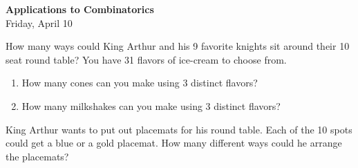 \documentclass[12pt]{article}
\theoremstyle{plain}
\theoremstyle{definition}
\theoremstyle{remark}
\begin{document}
\Large
\begin{center}
 \textbf{\LARGE Applications to Combinatorics}\\
 Friday, April 10
\end{center}

How many ways could King Arthur and his 9 favorite knights sit around their 10 seat round table?
\vfill
You have 31 flavors of ice-cream to choose from.
\begin{enumerate}
  \item How many cones can you make using 3 distinct flavors?
  \item How many milkshakes can you make using 3 distinct flavors?
\end{enumerate}
\vfill

\clearpage

King Arthur wants to put out placemats for his round table.  Each of the 10 spots could get a blue or a gold placemat.  How many different ways could he arrange the placemats?

\vfill
\end{document}
